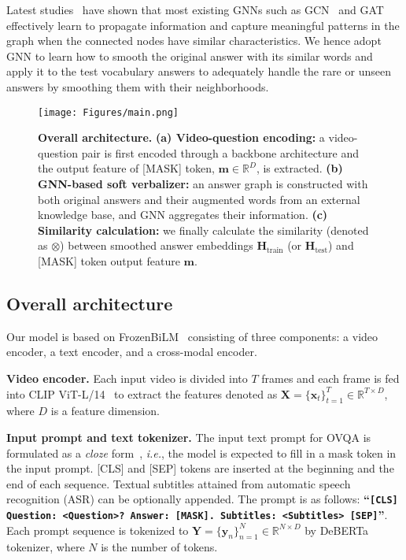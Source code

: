 \documentclass[10pt,twocolumn,letterpaper]{article}
\begin{document}
Latest studies~\cite{li2018deeper,wu2019simplifying} have shown that most existing GNNs such as GCN~\cite{kipf2016semi} and GAT~\cite{velivckovic2017graph} effectively learn to propagate information and capture meaningful patterns in the graph when the connected nodes have similar characteristics.
We hence adopt GNN to learn how to smooth the original answer with its similar words and apply it to the test vocabulary answers to adequately handle the rare or unseen answers by smoothing them with their neighborhoods. \begin{figure}[t] 
    \centering
    \texttt{[image: Figures/main.png]}
    \caption{\textbf{Overall architecture.} 
    \textbf{(a) Video-question encoding:} a video-question pair is first encoded through a backbone architecture and the output feature of [MASK] token, $\mathbf{m} \in \mathbb{R}^D$, is extracted.
    \textbf{(b) GNN-based soft verbalizer:} an answer graph is constructed with both original answers and their augmented words from an external knowledge base, and GNN aggregates their information.
    \textbf{(c) Similarity calculation:} we finally calculate the similarity (denoted as $\otimes$) between smoothed answer embeddings $\mathbf{H}_\text{train}$ (or $\mathbf{H}_\text{test}$) and [MASK] token output feature $\mathbf{m}$.
    }
    \label{fig:main}
\end{figure} \subsection{Overall architecture}

Our model is based on FrozenBiLM~\cite{yang2022zero} consisting of three components: a video encoder, a text encoder, and a cross-modal encoder.

\noindent \textbf{Video encoder.}
Each input video is divided into $T$ frames and each frame is fed into CLIP ViT-L/14~\cite{radford2021learning, dosovitskiy2020image} to extract the features denoted as $\mathbf{X} = \{\mathbf{x}_t\}_{t=1}^T \in \mathbb{R}^{T \times D}$, where $D$ is a feature dimension.

\noindent \textbf{Input prompt and text tokenizer.}
The input text prompt for OVQA is formulated as a \textit{cloze} form~\cite{schick2021exploiting, taylor1953cloze}, \textit{i.e.}, the model is expected to fill in a mask token in the input prompt. 
[CLS] and [SEP] tokens are inserted at the beginning and the end of each sequence.
Textual subtitles attained from automatic speech recognition (ASR) can be optionally appended.
The prompt is as follows: {\small \textbf{``\texttt{[CLS] Question: <Question>? Answer: [MASK]. Subtitles: <Subtitles> [SEP]}''}}.
Each prompt sequence is tokenized to $\mathbf{Y} = \{\mathbf{y}_n\}_{n=1}^{N} \in \mathbb{R}^{N \times D}$ by DeBERTa~\cite{he2020deberta} tokenizer, where $N$ is the number of tokens.
\end{document}
